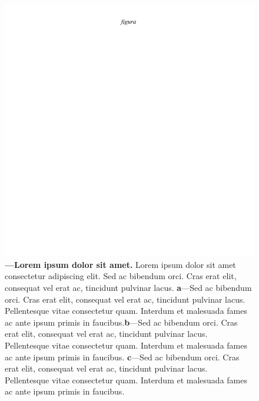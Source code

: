 \documentclass[./main.tex]{subfiles}
\begin{document}
\begin{figure}[t!] 
\centering				
\includegraphics[width=0.95\linewidth]{figs/fig_g.jpg}		
\caption[Lorem ipsum dolor sit amet]
{\textbf{---\;Lorem ipsum dolor sit amet.}
    Lorem ipsum dolor sit amet consectetur adipiscing elit. Sed ac bibendum orci. Cras erat elit, consequat vel erat ac, tincidunt pulvinar lacus. \;\textbf{a}\;---\;Sed ac bibendum orci. Cras erat elit, consequat vel erat ac, tincidunt pulvinar lacus. Pellentesque vitae consectetur quam. Interdum et malesuada fames ac ante ipsum primis in faucibus.\;\textbf{b}\;---\;Sed ac bibendum orci. Cras erat elit, consequat vel erat ac, tincidunt pulvinar lacus. Pellentesque vitae consectetur quam. Interdum et malesuada fames ac ante ipsum primis in faucibus. \;\textbf{c}\;---\;Sed ac bibendum orci. Cras erat elit, consequat vel erat ac, tincidunt pulvinar lacus. Pellentesque vitae consectetur quam. Interdum et malesuada fames ac ante ipsum primis in faucibus.
}
\label{fig:hydro:diff} 		
\end{figure}
\end{document}
